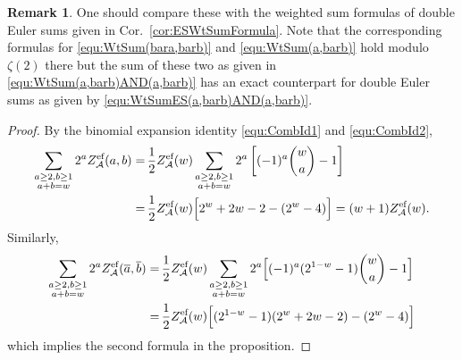 \documentclass{article}
\newcommand{\calA}{\mathcal{A}}
\newcommand{\eff}{\text{\rm{ef}}}
\newcommand{\ol}{\overline}
\theoremstyle{plain}
\theoremstyle{definition}
\newtheorem{rem}[thm]{Remark}
\begin{document}
\begin{rem}
One should compare these with the weighted sum formulas of double Euler sums given in Cor.~\ref{cor:ESWtSumFormula}. Note that the corresponding formulas for \eqref{equ:WtSum(bara,barb)} and \eqref{equ:WtSum(a,barb)} hold modulo $\zeta(2)$ there but the sum of these two as given in \eqref{equ:WtSum(a,barb)AND(a,barb)} has an exact counterpart for double Euler sums as given by \eqref{equ:WtSumES(a,barb)AND(a,barb)}.
\end{rem}

\begin{proof}
By the binomial expansion identity \eqref{equ:CombId1} and  \eqref{equ:CombId2},
\begin{align*}
  \sum_{\substack{a\ge 2,b\ge 1\\ a+b=w}} 2^a Z_\calA^\eff(a,b)
  =&\, \frac12 Z_\calA^\eff(w)\sum_{\substack{a\ge 2,b\ge 1\\ a+b=w}}   2^a \left[(-1)^a \binom{w}{a}-1\right] \\
  =&\, \frac12 Z_\calA^\eff(w) \Big[2^w+2w-2-(2^w-4)\Big]
  =(w+1)Z_\calA^\eff(w).
\end{align*}
Similarly,
\begin{align*}
  \sum_{\substack{a\ge 2,b\ge 1\\ a+b=w}} 2^a Z_\calA^\eff(\ol{a},\ol{b})
  =&\, \frac12 Z_\calA^\eff(w)\sum_{\substack{a\ge 2,b\ge 1\\ a+b=w}}   2^a \Big[(-1)^a (2^{1-w}-1)\binom{w}{a}-1 \Big] \\
  =&\, \frac12 Z_\calA^\eff(w) \Big[(2^{1-w}-1)(2^w+2w-2)-(2^w-4)\Big]
\end{align*}
which implies the second formula in the proposition.


\end{proof}
\end{document}
